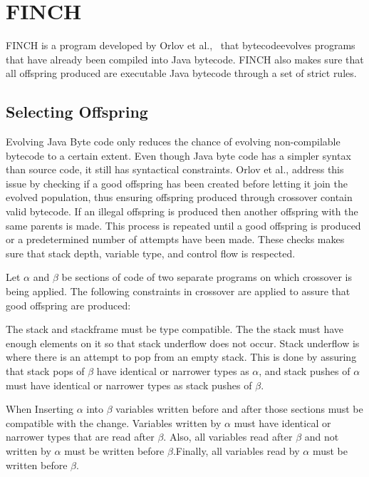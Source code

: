 \documentclass{sig-alternate}
\begin{document}
\section{FINCH}
FINCH is a program developed by Orlov et al.,~\cite{FINCH2:2009,FINCH:2011} that bytecodeevolves programs that have already been compiled into Java bytecode. FINCH also makes sure that all offspring produced are executable Java bytecode through a set of strict rules. 

\subsection{Selecting Offspring}
Evolving Java Byte code only reduces the chance of evolving non-compilable bytecode to a certain extent. Even though Java byte code has a simpler syntax than source code, it still has syntactical constraints. Orlov et al.,\cite{FINCH2:2009} address this issue by checking if a good offspring has been created before letting it join the evolved population, thus ensuring offspring produced through crossover contain valid bytecode. If an illegal offspring is produced then another offspring with the same parents is made. This process is repeated until a good offspring is produced or a predetermined number of attempts have been made. These checks makes sure that stack depth, variable type, and control flow is respected.\par

Let $\alpha$ and $\beta$ be sections of code of two separate programs on which crossover is being applied.
The following constraints in crossover are applied to assure that good offspring are produced:\par

The stack and stackframe must be type compatible. The the stack must have enough elements on it so that stack underflow does not occur. Stack underflow is where there is an attempt to pop from an empty stack. This is done by assuring that stack pops of $\beta$ have identical or narrower types as $\alpha$, and stack pushes of $\alpha$ must have identical or narrower types as stack pushes of $\beta$. \par


When Inserting $\alpha$ into $\beta$ variables written before and after those sections must be compatible with the change. Variables written by $\alpha$ must have identical or narrower types that are read after $\beta$. Also, all variables read after $\beta$ and not written by $\alpha$ must be written before $\beta$.Finally, all variables read by $\alpha$ must be written before $\beta$.\par
\end{document}
